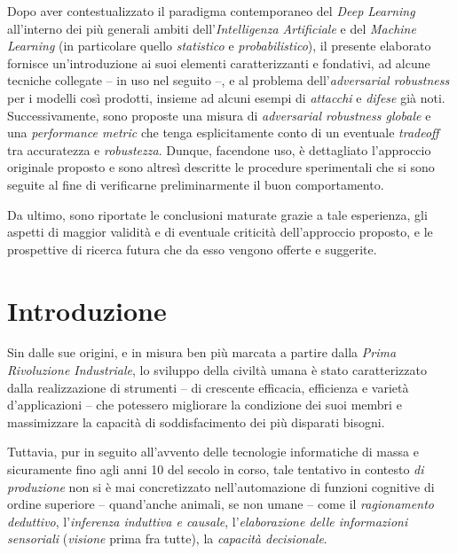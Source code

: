 \documentclass[a4paper, twoside]{article}
\begin{document}
Dopo aver contestualizzato il paradigma contemporaneo del \textit{Deep Learning} all'interno dei più generali ambiti dell'\textit{Intelligenza Artificiale} e del \textit{Machine Learning} (in particolare quello \textit{statistico} e \textit{probabilistico}), il presente elaborato fornisce un'introduzione ai suoi elementi caratterizzanti e fondativi, ad alcune tecniche collegate -- in uso nel seguito --, e al problema dell'\textit{adversarial robustness} per i modelli così prodotti, insieme ad alcuni esempi di \textit{attacchi} e \textit{difese} già noti.\\
Successivamente, sono proposte una misura di \textit{adversarial robustness globale} e una \textit{performance metric} che tenga esplicitamente conto di un eventuale \textit{tradeoff} tra accuratezza e \textit{robustezza}. Dunque, facendone uso, è dettagliato l'approccio originale proposto e sono altresì descritte le procedure sperimentali che si sono seguite al fine di verificarne preliminarmente il buon comportamento.

Da ultimo, sono riportate le conclusioni maturate grazie a tale esperienza, gli aspetti di maggior validità e di eventuale criticità dell'approccio proposto, e le prospettive di ricerca futura che da esso vengono offerte e suggerite.



\newpage
\section{Introduzione}

Sin dalle sue origini, e in misura ben più marcata a partire dalla \textit{Prima Rivoluzione Industriale}, lo sviluppo della civiltà umana è stato caratterizzato dalla realizzazione di strumenti -- di crescente efficacia, efficienza e varietà d'applicazioni -- che potessero migliorare la condizione dei suoi membri e massimizzare la capacità di soddisfacimento dei più disparati bisogni.

Tuttavia, pur in seguito all'avvento delle tecnologie informatiche di massa e sicuramente fino agli anni 10 del secolo in corso, tale tentativo in contesto \textit{di produzione} non si è mai concretizzato nell'automazione di funzioni cognitive di ordine superiore -- quand'anche animali, se non umane -- come il \textit{ragionamento deduttivo}, l'\textit{inferenza induttiva e causale}, l'\textit{elaborazione delle informazioni sensoriali} (\textit{visione} prima fra tutte), la \textit{capacità decisionale}.
\end{document}
